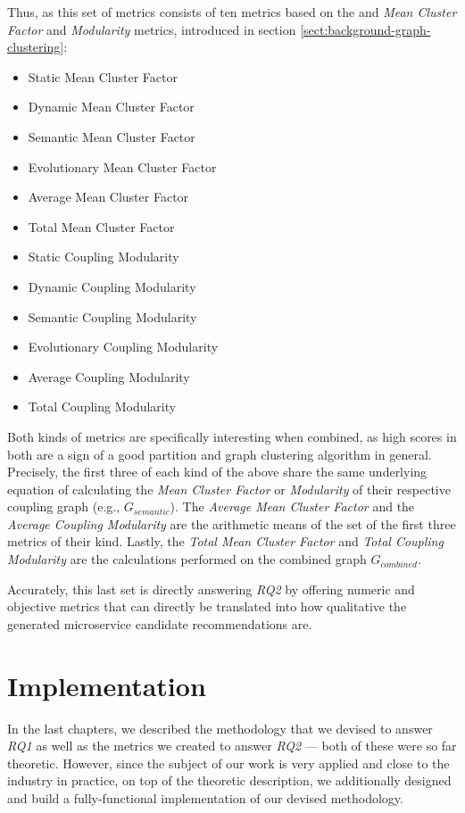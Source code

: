 \documentclass[12pt,a4paper]{report}
\begin{document}
Thus, as this set of metrics consists of ten metrics based on the and \textit{
Mean Cluster Factor} and \textit{Modularity} metrics, introduced in section
\ref{sect:background-graph-clustering}:
\begin{itemize}[noitemsep]
  \item Static Mean Cluster Factor
  \item Dynamic Mean Cluster Factor
  \item Semantic Mean Cluster Factor
  \item Evolutionary Mean Cluster Factor
  \item Average Mean Cluster Factor
  \item Total Mean Cluster Factor
  \item Static Coupling Modularity
  \item Dynamic Coupling Modularity
  \item Semantic Coupling Modularity
  \item Evolutionary Coupling Modularity
  \item Average Coupling Modularity
  \item Total Coupling Modularity
\end{itemize}
Both kinds of metrics are specifically
interesting when combined, as high scores in both are a sign of a good
partition and graph clustering algorithm in general. Precisely, the first three
of each kind of the above share the same underlying equation of calculating the
\textit{Mean Cluster Factor} or \textit{Modularity} of their respective
coupling graph (e.g., \(G_{semantic}\)). The \textit{Average Mean Cluster
Factor} and the \textit{Average Coupling Modularity} are the arithmetic means
of the set of the first three metrics of their kind. Lastly, the \textit{Total
Mean Cluster Factor} and \textit{Total Coupling Modularity} are the
calculations performed on the combined graph \(G_{combined}\).

Accurately, this last set is directly answering \textit{RQ2} by offering
numeric and objective metrics that can directly be translated into how
qualitative the generated microservice candidate recommendations are.




\chapter{Implementation} \label{chap:implementation}

In the last chapters, we described the methodology that we devised to answer
\textit{RQ1} as well as the metrics we created to answer \textit{RQ2} --- both
of these were so far theoretic. However, since the subject of our work is very
applied and close to the industry in practice, on top of the theoretic
description, we additionally designed and build a fully-functional
implementation of our devised methodology.
\end{document}
